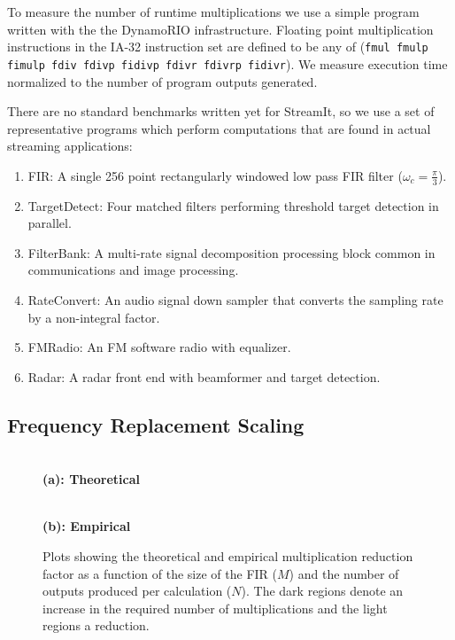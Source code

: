 To measure the number of runtime multiplications we use a simple program written with the 
the DynamoRIO\cite{dynamo99} infrastructure. Floating point multiplication instructions 
in the IA-32 instruction set are defined to be any of ({\tt fmul fmulp fimulp fdiv fdivp fidivp fdivr fdivrp fidivr}).
We measure execution time normalized to the number of program outputs generated.

There are no standard benchmarks written yet for StreamIt, so we use
a set of representative programs which perform computations that 
are found in actual streaming applications: 

\begin{enumerate}
\item FIR: A single 256 point rectangularly windowed low pass FIR filter ($\omega_c=\frac{\pi}{3}$).
\vspace{-6pt}

\item TargetDetect: Four matched filters performing threshold target detection in parallel.
\vspace{-6pt}

\item FilterBank: A multi-rate signal decomposition processing block common in communications and image processing.
\vspace{-6pt}

\item RateConvert: An audio signal down sampler that converts the sampling rate by a non-integral factor.
\vspace{-6pt}

\item FMRadio: An FM software radio with equalizer.
\vspace{-6pt}

\item Radar: A radar front end with beamformer and target detection.
\vspace{-6pt}
\end{enumerate}



\subsection{Frequency Replacement Scaling}

\begin{figure*}[t]
\center
\begin{minipage}{3.4 in}
\center
\epsfxsize=2.2in
 \\
{\bf (a): Theoretical}
\end{minipage} 
\begin{minipage}{3.4 in}
\center
\epsfxsize=2.2in
 \\
{\bf (b): Empirical}
\end{minipage}
\caption{Plots showing the theoretical and empirical multiplication reduction factor as a function of the size of the FIR ($M$) and the number of outputs produced per calculation ($N$). The dark regions denote an increase in the required number of multiplications and the light regions a reduction.}
\label{fig:frequency-win}
\end{figure*}

